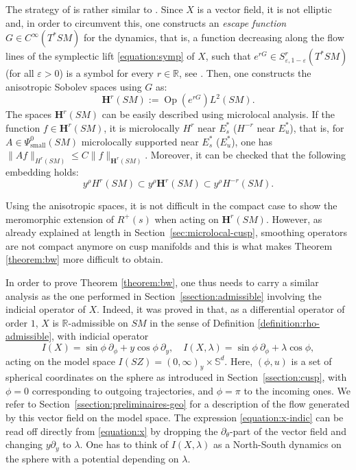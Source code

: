 \documentclass[JEP,XML,SOM,Unicode,NoFloatCountersInSection]{cedram}
\newcommand{\bH}{\boldsymbol{H}}
\newcommand{\R}{\mathbb{R}}
\newcommand{\Ss}{\mathbb{S}}
\newcommand{\eps}{\varepsilon}
\newcommand{\ZZ}{I(SZ)}
\DeclareMathOperator{\Op}{Op}
\theoremstyle{plain}
\theoremstyle{definition}
\begin{document}
The strategy of \cite{Bonthonneau-Weich-17} is rather similar to \cite{Faure-Sjostrand-11}. Since $X$ is a vector field, it is not elliptic and, in order to circumvent this, one constructs an \emph{escape function} $G \in C^\infty(T^*SM)$ for the dynamics, that is, a function decreasing along the flow lines of the symplectic lift \eqref{equation:symp} of $X$, such that $e^{rG} \in S^{r}_{\eps,1-\eps}(T^*SM)$ (for all $\eps > 0$) is a symbol for every $r\in\R$, see \cite[Lem.\,2.3]{Bonthonneau-Weich-17}. Then, one constructs the anisotropic Sobolev spaces using $G$ as:
\[
\bH^r(SM) := \Op(e^{rG})L^2(SM).
\]
The spaces $\bH^r(SM)$ can be easily described using microlocal analysis. If the function $f \in \bH^r(SM)$, it is microlocally $H^r$ near $E_s^*$ (\resp $H^{-r}$ near $E_u^*$), that is, for $A \in \Psi^0_{\mathrm{small}}(SM)$ microlocally supported near $E_s^*$ (\resp $E_u^*$), one has $\|Af\|_{H^r(SM)} \leq C \|f\|_{\bH^r(SM)}$. Moreover, it can be checked that the following embedding holds:
\begin{equation}
\label{equation:embedding-plot}
y^\rho H^r(SM) \subset y^\rho \bH^r(SM) \subset y^\rho H^{-r}(SM).
\end{equation}

Using the anisotropic spaces, it is not difficult in the compact case to show the meromorphic extension of $R^+(s)$ when acting on $\bH^r(SM)$. However, as already explained at length in Section~\ref{sec:microlocal-cusp}, smoothing operators are not compact anymore on cusp manifolds and this is what makes Theorem \ref{theorem:bw} more difficult to obtain.

In order to prove Theorem \ref{theorem:bw}, one thus needs to carry a similar analysis as the one performed in Section~\ref{ssection:admissible} involving the indicial operator of $X$. Indeed, it was proved in \cite{Bonthonneau-Weich-17} that, as a differential operator of order $1$, $X$ is $\R$-admissible on $SM$ in the sense of Definition \ref{definition:rho-admissible}, with indicial operator
\begin{equation}
\label{equation:x-indic}
I(X) =\sin\phi~\partial_\phi + y\cos\phi~\partial_y,\quad I(X,\lambda) = \sin\phi~\partial_\phi + \lambda \cos\phi,
\end{equation}
acting on the model space $\ZZ = (0,\infty)_y \times \Ss^d$. Here, $(\phi,u)$ is a set of spherical coordinates on the sphere as introduced in Section~\ref{ssection:cusp}, with $\phi=0$ corresponding to outgoing trajectories, and $\phi=\pi$ to the incoming ones. We refer to Section~\ref{ssection:preliminaires-geo} for a description of the flow generated by this vector field on the model space. The expression \eqref{equation:x-indic} can be read off directly from \eqref{equation:x} by dropping the $\partial_\theta$-part of the vector field and changing $y\partial_y$ to $\lambda$. One has to think of $I(X,\lambda)$ as a North-South dynamics on the sphere with a potential depending on $\lambda$.
\end{document}

